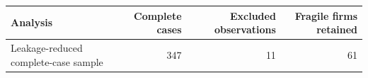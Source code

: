 \begin{tabular}{lrrr}
\toprule
Analysis & Complete cases & Excluded observations & Fragile firms retained \\
\midrule
Leakage-reduced complete-case sample & 347 & 11 & 61 \\
\bottomrule
\end{tabular}
